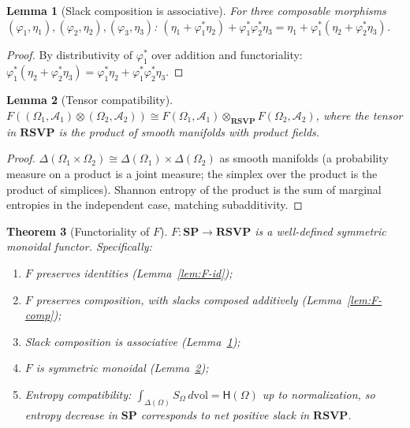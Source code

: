 \documentclass[12pt,a4paper]{article}
\newtheorem{theorem}{Theorem}[section]
\newtheorem{lemma}[theorem]{Lemma}
\theoremstyle{definition}
\theoremstyle{remark}
\newcommand{\Ent}{\mathsf{H}}
\newcommand{\SP}{\mathbf{SP}}
\newcommand{\RSVP}{\mathbf{RSVP}}
\newcommand{\tensor}{\otimes}
\newcommand{\SF}{S}
\begin{document}
\begin{lemma}[Slack composition is associative]
\label{lem:slack-assoc}
For three composable morphisms $(\varphi_1,\eta_1),(\varphi_2,\eta_2),(\varphi_3,\eta_3)$:
$(\eta_1+\varphi_1^*\eta_2)+\varphi_1^*\varphi_2^*\eta_3=
\eta_1+\varphi_1^*(\eta_2+\varphi_2^*\eta_3)$.
\end{lemma}

\begin{proof}
By distributivity of $\varphi_1^*$ over addition and functoriality:
$\varphi_1^*(\eta_2+\varphi_2^*\eta_3)=\varphi_1^*\eta_2+\varphi_1^*\varphi_2^*\eta_3$.
\end{proof}

\begin{lemma}[Tensor compatibility]
\label{lem:F-tensor}
$F((\Omega_1,\mathcal{A}_1)\tensor(\Omega_2,\mathcal{A}_2))\cong
F(\Omega_1,\mathcal{A}_1)\tensor_\RSVP F(\Omega_2,\mathcal{A}_2)$,
where the tensor in $\RSVP$ is the product of smooth manifolds with product fields.
\end{lemma}

\begin{proof}
$\Delta(\Omega_1\times\Omega_2)\cong\Delta(\Omega_1)\times\Delta(\Omega_2)$ as smooth
manifolds (a probability measure on a product is a joint measure; the simplex over
the product is the product of simplices). Shannon entropy of the product is the sum
of marginal entropies in the independent case, matching subadditivity.
\end{proof}

\begin{theorem}[Functoriality of $F$]
\label{thm:functor}
$F:\SP\to\RSVP$ is a well-defined symmetric monoidal functor. Specifically:
\begin{enumerate}[label=(\alph*)]
\item $F$ preserves identities (Lemma~\ref{lem:F-id});
\item $F$ preserves composition, with slacks composed additively (Lemma~\ref{lem:F-comp});
\item Slack composition is associative (Lemma~\ref{lem:slack-assoc});
\item $F$ is symmetric monoidal (Lemma~\ref{lem:F-tensor});
\item Entropy compatibility: $\int_{\Delta(\Omega)}\SF_\Omega\,d\mathrm{vol}=\Ent(\Omega)$
  up to normalization, so entropy decrease in $\SP$ corresponds to net positive slack
  in $\RSVP$.
\end{enumerate}
\end{theorem}
\end{document}
